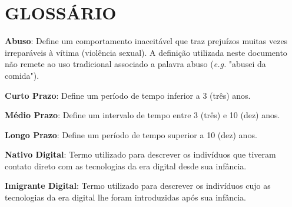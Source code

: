 






\chapter*{GLOSSÁRIO}

{ \setlength{\parindent}{0pt} %




\textbf{Abuso}: Define um comportamento inaceitável que traz prejuízos muitas vezes irreparáveis à vítima (violência sexual). A definição utilizada neste documento não remete ao uso tradicional associado a palavra abuso (\textit{e.g.} "abusei da comida").

\textbf{Curto Prazo}: Define um período de tempo inferior a 3 (três) anos. 

\textbf{Médio Prazo}: Define um intervalo de tempo entre 3 (três) e 10 (dez) anos. 

\textbf{Longo Prazo}: Define um período de tempo superior a 10 (dez) anos. 


\textbf{Nativo Digital}: Termo utilizado para descrever os indivíduos que tiveram contato direto com as tecnologias da era digital desde sua infância. 

\textbf{Imigrante Digital}: Termo utilizado para descrever os indivíduos cujo as tecnologias da era digital lhe foram introduzidas após sua infância. 

}
